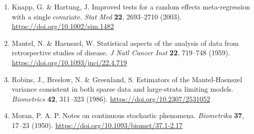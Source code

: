 \begin{enumerate}
\item
  Knapp, G. \& Hartung, J. Improved tests for a random effects meta-regression with a single covariate. \emph{Stat Med} \textbf{22}, 2693--2710 (2003). \url{https://doi.org/10.1002/sim.1482}
\item
  Mantel, N. \& Haenszel, W. Statistical aspects of the analysis of data from retrospective studies of disease. \emph{J Natl Cancer Inst} \textbf{22}, 719--748 (1959). \url{https://doi.org/10.1093/jnci/22.4.719}
\item
  Robins, J., Breslow, N. \& Greenland, S. Estimators of the Mantel-Haenszel variance consistent in both sparse data and large-strata limiting models. \emph{Biometrics} \textbf{42}, 311--323 (1986). \url{https://doi.org/10.2307/2531052}
\item
  Moran, P. A. P. Notes on continuous stochastic phenomena. \emph{Biometrika} \textbf{37}, 17--23 (1950). \url{https://doi.org/10.1093/biomet/37.1-2.17}
\end{enumerate}
